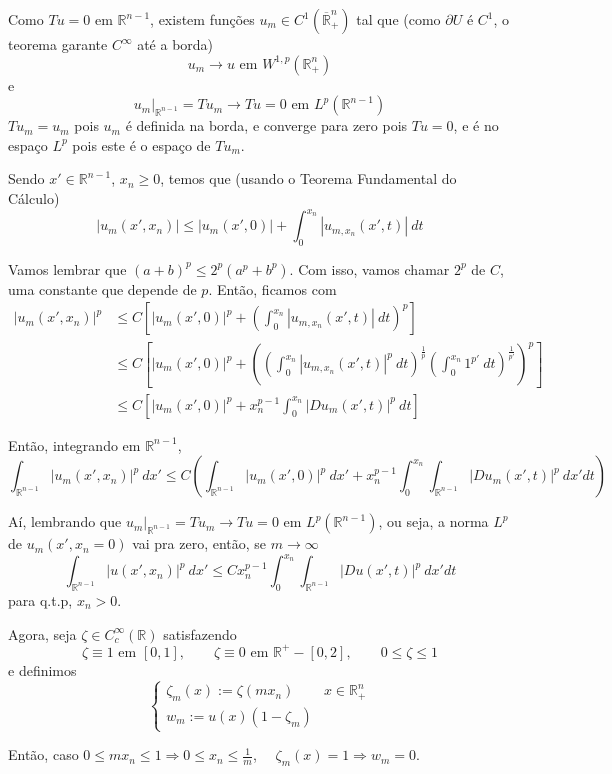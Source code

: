 \documentclass[11pt]{article}
\newcommand{\R}{\mathbb{R}}
\newcommand{\pu}{\partial U}
\begin{document}
Como $ Tu=0 $ em $ \R^{n-1} $, existem funções $ u_m \in C^1(\overline{\R}^n_+) $ tal que (como $\pu$ é $C^1$, o teorema garante $C^\infty$ até a borda) \[ u_m \rightarrow u  \text{ em } W^{1,p}(\R^n_+)\] e \[ u_m |_{\R^{n-1}} = Tu_m  \rightarrow Tu =0  \text{ em } L^p(\R^{n-1})\] $ Tu_m=u_m $ pois $ u_m $ é definida na borda, e converge para zero pois $Tu=0$, e é no espaço $ L^p $ pois este é o espaço de $ Tu_m $.

Sendo $ x' \in \R^{n-1} $, $ x_n\geq0 $, temos que (usando o Teorema Fundamental do Cálculo) \[ \left| u_m(x', x_n) \right| \leq | u_m(x',0) | + \int_0^{x_n} |u_{m,x_n}(x',t)| \ dt   \] 

Vamos lembrar que \( (a+b)^p \leq 2^p (a^p + b^p) \). Com isso, vamos chamar \( 2^p \) de $C$, uma constante que depende de $p$. Então, ficamos com \begin{align*}
	\left| u_m(x', x_n) \right|^p &\leq C \left[ | u_m(x',0) |^p + \left( \int_0^{x_n} |u_{m,x_n}(x',t)| \ dt \right)^p \right] \\
	&\leq C \left[ | u_m(x',0) |^p + \left( \left(\int_0^{x_n} |u_{m,x_n}(x',t)|^p \ dt\right)^{\frac{1}{p}} \left(\int_0^{x_n}1^{p'}\ dt\right)^{\frac{1}{p'}}  \right)^p \right] \\
	&\leq C\left[ | u_m(x',0) |^p + x_n^{p-1} \int_0^{x_n} |Du_{m}(x',t)|^{p}\ dt \right]
\end{align*}



Então, integrando em $\R^{n-1}$, \[ \int_{\R^{n-1}} | u_m(x',x_n) |^p\ dx' \leq C \left(  \int_{\R^{n-1}} | u_m(x',0) |^p \ dx' + x_n^{p-1} \int_0^{x_n} \int_{\R^{n-1}} | Du_m(x',t)|^p\ dx' dt  \right)\]

Aí, lembrando que $ u_m |_{\R^{n-1}} = Tu_m \rightarrow Tu=0 \text{ em } L^p(\R^{n-1})$, ou seja, a norma $L^p$ de $u_m(x',x_n=0)$ vai pra zero, então, se $m \rightarrow \infty$ \[  \int_{\R^{n-1}} | u(x',x_n) |^p\ dx' \leq C  x_n^{p-1} \int_0^{x_n} \int_{\R^{n-1}} | Du(x',t)|^p\ dx' dt  \] para q.t.p, $x_n>0$.


Agora, seja $\zeta \in C^\infty_c(\R)$ satisfazendo \[ \zeta \equiv 1 \text{ em } [0,1], \qquad \zeta \equiv 0 \text{ em } \R^+ - [0,2], \qquad 0 \leq \zeta \leq 1 \] e definimos \[ \begin{cases}
	\zeta_m(x) := \zeta (mx_n) & x \in \R^n_+ \\
	w_m := u(x)(1 - \zeta_m)
\end{cases} \]

Então, caso $ 0 \leq mx_n \leq 1 \Rightarrow 0 \leq x_n \leq \frac{1}{m} $, $\quad \zeta_m(x)=1 \Rightarrow w_m=0$.
\end{document}
